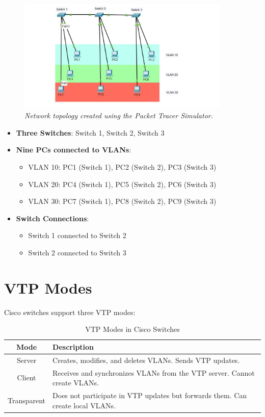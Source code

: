 \documentclass[a4paper]{book}
\begin{document}
\begin{figure}[h]
    \centering
    \includegraphics[width=0.9\textwidth]{network_topology.jpg}
    \caption{\textit{Network topology created using the Packet Tracer Simulator.}}

    \label{fig:packet_tracer_topology}
\end{figure}


\begin{itemize}
    \item \textbf{Three Switches}: Switch 1, Switch 2, Switch 3
    \item \textbf{Nine PCs connected to VLANs}:
    \begin{itemize}
        \item VLAN 10: PC1 (Switch 1), PC2 (Switch 2), PC3 (Switch 3)
        \item VLAN 20: PC4 (Switch 1), PC5 (Switch 2), PC6 (Switch 3)
        \item VLAN 30: PC7 (Switch 1), PC8 (Switch 2), PC9 (Switch 3)
    \end{itemize}
    \item \textbf{Switch Connections}: 
    \begin{itemize}
        \item Switch 1 connected to Switch 2
        \item Switch 2 connected to Switch 3
    \end{itemize}
\end{itemize}

\section{VTP Modes}
Cisco switches support three VTP modes:

\begin{table}[h]
    \centering
    \begin{tabular}{|c|p{10cm}|}
        \hline
        \textbf{Mode} & \textbf{Description} \\
        \hline
        Server & Creates, modifies, and deletes VLANs. Sends VTP updates. \\
        \hline
        Client & Receives and synchronizes VLANs from the VTP server. Cannot create VLANs. \\
        \hline
        Transparent & Does not participate in VTP updates but forwards them. Can create local VLANs. \\
        \hline
    \end{tabular}
    \caption{VTP Modes in Cisco Switches}
\end{table}
\end{document}
